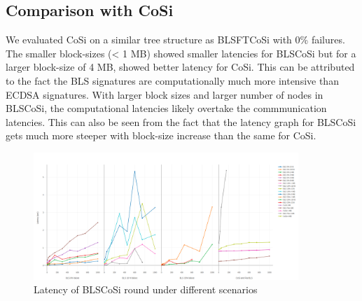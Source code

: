 \subsection{Comparison with CoSi}
We evaluated CoSi on a similar tree structure as BLSFTCoSi with 0\% failures. The smaller block-sizes (< 1 MB) showed smaller latencies for BLSCoSi but for a larger block-size of 4 MB, showed better latency for CoSi. This can be attributed to the fact the BLS signatures are computationally much more intensive than ECDSA signatures. With larger block sizes and larger number of nodes in BLSCoSi, the computational latencies likely overtake the commmunication latencies. This can also be seen from the fact that the latency graph for BLSCoSi gets much more steeper with block-size increase than the same for CoSi.

\begin{figure}[h]
	\includegraphics[angle=90,width=10cm]{all.png}
	\caption{Latency of BLSCoSi round under different scenarios}
	\label{fig}
\end{figure}
\clearpage